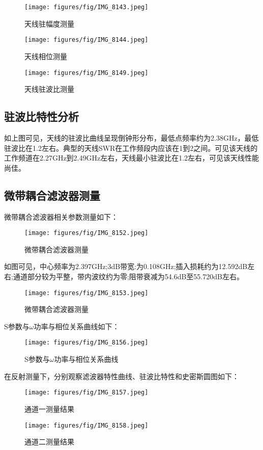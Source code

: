 \documentclass[12pt,hyperref,a4paper,UTF8]{ctexart}
\begin{document}
\begin{figure}[H]
    \centering
    \texttt{[image: figures/fig/IMG\_8143.jpeg]}
    \caption{天线驻幅度测量}
    \label{fig:enter-label}
\end{figure}

\begin{figure}[H]
    \centering
    \texttt{[image: figures/fig/IMG\_8144.jpeg]}
    \caption{天线相位测量}
    \label{fig:enter-label}
\end{figure}

\begin{figure}[H]
    \centering
    \texttt{[image: figures/fig/IMG\_8149.jpeg]}
    \caption{天线驻波比测量}
    \label{fig:enter-label}
\end{figure}

\subsection*{驻波比特性分析}

如上图可见，天线的驻波比曲线呈现倒钟形分布，最低点频率约为2.38GHz，最低驻波比在1.2左右。典型的天线SWR在工作频段内应该在1到2之间。可见该天线的工作频道在2.27GHz到2.49GHz左右，天线最小驻波比在1.2左右，可见该天线性能尚佳。


\subsection{微带耦合滤波器测量}
微带耦合滤波器相关参数测量如下：
\begin{figure}[H]
    \centering
    \texttt{[image: figures/fig/IMG\_8152.jpeg]}
    \caption{微带耦合滤波器测量}
    \label{fig:enter-label}
\end{figure}
如图可见，中心频率为2.397GHz;3dB带宽:为0.108GHz;插入损耗约为12.592dB左右;通道部分较为平整，带内波纹约为零;阻带衰减为54.6dB至55.720dB左右。

\begin{figure}[H]
    \centering
    \texttt{[image: figures/fig/IMG\_8153.jpeg]}
    \caption{微带耦合滤波器测量}
    \label{fig:enter-label}
\end{figure}

S参数与$\omega$功率与相位关系曲线如下：
\begin{figure}[H]
    \centering
    \texttt{[image: figures/fig/IMG\_8156.jpeg]}
    \caption{S参数与$\omega$功率与相位关系曲线}
    \label{fig:enter-label}
\end{figure}
在反射测量下，分别观察滤波器特性曲线、驻波比特性和史密斯圆图如下：
\begin{figure}[H]
    \centering
    \texttt{[image: figures/fig/IMG\_8157.jpeg]}
    \caption{通道一测量结果}
    \label{fig:enter-label}
\end{figure}
\begin{figure}[H]
    \centering
    \texttt{[image: figures/fig/IMG\_8158.jpeg]}
    \caption{通道二测量结果}
    \label{fig:enter-label}
\end{figure}
\end{document}
